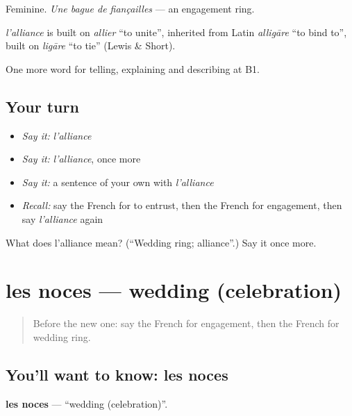 Feminine. \emph{Une bague de fiançailles} — an engagement ring.

\begin{cousinweb}
\emph{l'alliance} is built on \emph{allier} \textquotedblleft{}to unite\textquotedblright{}, inherited from Latin \emph{alligāre} \textquotedblleft{}to bind to\textquotedblright{}, built on \emph{ligāre} \textquotedblleft{}to tie\textquotedblright{} (Lewis \& Short).
\end{cousinweb}

\begin{grammarlens}[title={What you've built}]
One more word for telling, explaining and describing at B1.
\end{grammarlens}

\subsection*{Your turn}
\begin{itemize}
\raggedright
  \item \emph{Say it:} \emph{l'alliance}
  \item \emph{Say it:} \emph{l'alliance}, once more
  \item \emph{Say it:} a sentence of your own with \emph{l'alliance}
  \item \emph{Recall:} say the French for to entrust, then the French for engagement, then say \emph{l'alliance} again
\end{itemize}

\begin{tcolorbox}[breakable,colback=teal!4,colframe=teal!35!black,title={Before you move on}]
What does l'alliance mean? (\textquotedblleft{}Wedding ring; alliance\textquotedblright{}.) Say it once more.
\end{tcolorbox}
\section[les noces]{les noces — wedding (celebration)}

\label{lesson:FR-C489-noces}



\begin{quote}
Before the new one: say the French for engagement, then the French for wedding ring.
\end{quote}

\subsection*{You'll want to know: les noces}
\textbf{les noces} — \textquotedblleft{}wedding (celebration)\textquotedblright{}.

